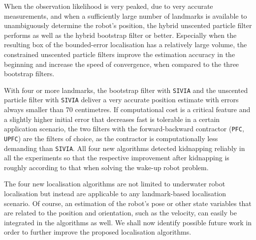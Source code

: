 When the observation likelihood is very peaked, due to very accurate measurements, and when a sufficiently large number of landmarks is available to unambiguously determine the robot's position, the hybrid unscented particle filter performs as well as the hybrid bootstrap filter or better. Especially when the resulting box of the bounded-error localisation has a relatively large volume, the constrained unscented particle filters improve the estimation accuracy in the beginning and increase the speed of convergence, when compared to the three bootstrap filters.




With four or more landmarks, the bootstrap filter with \texttt{SIVIA} and the unscented particle filter with \texttt{SIVIA} deliver a very accurate position estimate with errors always smaller than 70 centimetres. If computational cost is a critical feature and a slightly higher initial error that decreases fast is tolerable in a certain application scenario, the two filters with the forward-backward contractor (\texttt{PFC}, \texttt{UPFC}) are the filters of choice, as the contractor is computationally less demanding than \texttt{SIVIA}. All four new algorithms detected kidnapping reliably in all the experiments so that the respective improvement after kidnapping is roughly according to that when solving the wake-up robot problem.

The four new localisation algorithms are not limited to underwater robot localisation but instead are applicable to any landmark-based localisation scenario. Of course, an estimation of the robot's pose or other state variables that are related to the position and orientation, such as the velocity, can easily be integrated in the algorithms as well. We shall now identify possible future work in order to further improve the proposed localisation algorithms.


